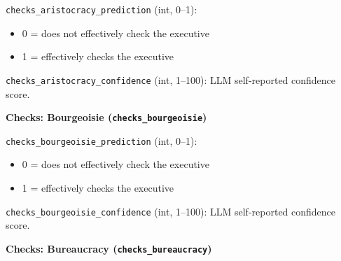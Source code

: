 \documentclass[11pt, a4paper]{article}
\newenvironment{promptquote}{%
  \begin{quote}\small
}{%
  \end{quote}
}
\begin{document}


\texttt{checks\_aristocracy\_prediction} (int, 0--1):
\begin{itemize}[nosep, leftmargin=1.7em]
  \item 0 = does not effectively check the executive
  \item 1 = effectively checks the executive
\end{itemize}
\texttt{checks\_aristocracy\_confidence} (int, 1--100): LLM self-reported confidence score.

\bigskip
\textbf{Checks: Bourgeoisie (\texttt{checks\_bourgeoisie})}




\texttt{checks\_bourgeoisie\_prediction} (int, 0--1):
\begin{itemize}[nosep, leftmargin=1.7em]
  \item 0 = does not effectively check the executive
  \item 1 = effectively checks the executive
\end{itemize}
\texttt{checks\_bourgeoisie\_confidence} (int, 1--100): LLM self-reported confidence score.

\bigskip
\textbf{Checks: Bureaucracy (\texttt{checks\_bureaucracy})}
\end{document}
